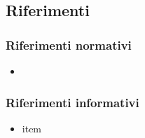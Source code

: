 \subsection{Riferimenti}

\subsubsection{Riferimenti normativi}
\begin{itemize}
	\item {}
\end{itemize}

\subsubsection{Riferimenti informativi}
\begin{itemize}
	\item item
\end{itemize}